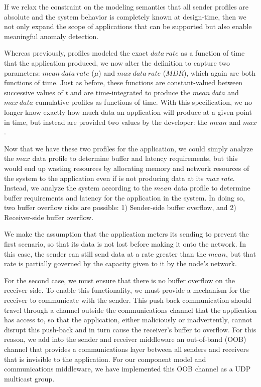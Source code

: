 If we relax the constraint on the modeling semantics that all
sender profiles are absolute and the system behavior is completely
known at design-time, then we not only expand the scope of
applications that can be supported but also enable meaningful anomaly
detection.

Whereas previously, profiles modeled the exact $data\ rate$ as a
function of time that the application produced, we now alter the
definition to capture two parameters: $mean\ data\ rate$ ($\mu$) and
$max\ data\ rate$ ($MDR$), which again are both functions of time.
Just as before, these functions are constant-valued between successive
values of $t$ and are time-integrated to produce the $mean\ data$ and
$max\ data$ cumulative profiles as functions of time.  With this
specification, we no longer know exactly how much data an application
will produce at a given point in time, but instead are provided two
values by the developer: the $mean$ and $max$.

Now that we have these two profiles for the application, we could
simply analyze the $max$ data profile to determine buffer and latency
requirements, but this would end up wasting resources by allocating
memory and network resources of the system to the application even if
is not producing data at its \emph{max rate}.  Instead, we analyze the
system according to the $mean$ data profile to determine buffer
requirements and latency for the application in the system.  In doing
so, two buffer overflow risks are possible: 1) Sender-side buffer
overflow, and 2) Receiver-side buffer overflow.

We make the assumption that the application meters its sending to
prevent the first scenario, so that its data is not lost before making
it onto the network.  In this case, the sender can still send data at
a rate greater than the $mean$, but that rate is partially
governed by the capacity given to it by the node's network.

For the second case, we must ensure that there is no buffer overflow
on the receiver-side.  To enable this functionality, we must provide a
mechanism for the receiver to communicate with the sender.  This
push-back communication should travel through a channel outside the
communications channel that the application has access to, so that the
application, either maliciously or inadvertently, cannot disrupt this
push-back and in turn cause the receiver's buffer to overflow.  For
this reason, we add into the sender and receiver middleware an
out-of-band (OOB) channel that provides a communications layer between
all senders and receivers that is invisible to the application.  For
our component model and communications middleware, we have implemented
this OOB channel as a UDP multicast group.

